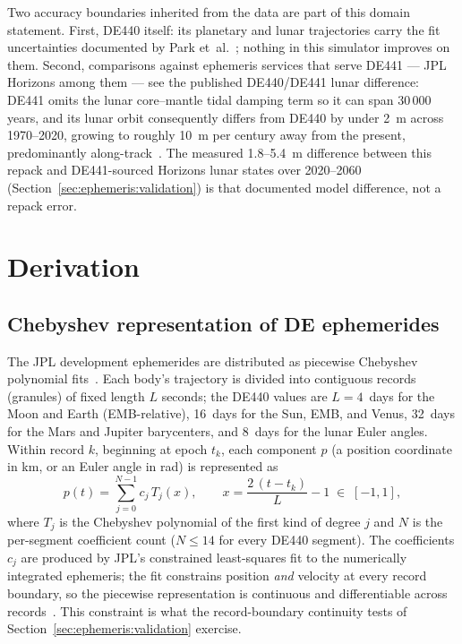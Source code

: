 Two accuracy boundaries inherited from the data are part of this domain
statement. First, DE440 itself: its planetary and lunar trajectories carry
the fit uncertainties documented by Park et~al.~\cite{park2021}; nothing in
this simulator improves on them. Second, comparisons against ephemeris
services that serve DE441 --- JPL Horizons among them --- see the published
DE440/DE441 lunar difference: DE441 omits the lunar core--mantle tidal
damping term so it can span 30\,000 years, and its lunar orbit consequently
differs from DE440 by under \qty{2}{\metre} across 1970--2020, growing to
roughly \qty{10}{\metre} per century away from the present, predominantly
along-track~\cite{park2021}. The measured 1.8--\qty{5.4}{\metre} difference
between this repack and DE441-sourced Horizons lunar states over 2020--2060
(Section~\ref{sec:ephemeris:validation}) is that documented model
difference, not a repack error.

\section{Derivation}
\label{sec:ephemeris:derivation}

\subsection{Chebyshev representation of DE ephemerides}

The JPL development ephemerides are distributed as piecewise Chebyshev
polynomial fits~\cite{newhall1989,park2021}. Each body's trajectory is
divided into contiguous records (granules) of fixed length $L$ seconds; the
DE440 values are $L = 4$~days for the Moon and Earth (EMB-relative), 16~days
for the Sun, EMB, and Venus, 32~days for the Mars and Jupiter barycenters,
and 8~days for the lunar Euler angles. Within record $k$, beginning at epoch
$t_k$, each component $p$ (a position coordinate in km, or an Euler angle in
rad) is represented as
\begin{equation}
  p(t) = \sum_{j=0}^{N-1} c_j\, T_j(x),
  \qquad
  x = \frac{2\,(t - t_k)}{L} - 1 \;\in\; [-1, 1],
  \label{eq:ephemeris:timescale}
\end{equation}
where $T_j$ is the Chebyshev polynomial of the first kind of degree $j$ and
$N$ is the per-segment coefficient count ($N \le 14$ for every DE440
segment). The coefficients $c_j$ are produced by JPL's constrained
least-squares fit to the numerically integrated ephemeris; the fit
constrains position \emph{and} velocity at every record boundary, so the
piecewise representation is continuous and differentiable across
records~\cite{newhall1989}. This constraint is what the record-boundary
continuity tests of Section~\ref{sec:ephemeris:validation} exercise.

